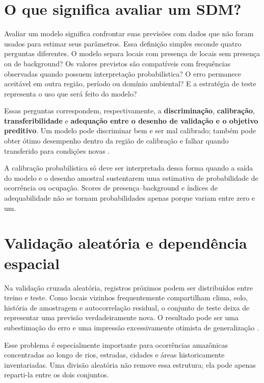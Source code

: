 \section{O que significa avaliar um SDM?}

Avaliar um modelo significa confrontar suas previsões com dados que não foram
usados para estimar seus parâmetros. Essa definição simples esconde quatro
perguntas diferentes. O modelo separa locais com presença de locais sem presença
ou de background? Os valores previstos são compatíveis com frequências
observadas quando possuem interpretação probabilística? O erro permanece
aceitável em outra região, período ou domínio ambiental? E a estratégia de teste
representa o uso que será feito do modelo?

Essas perguntas correspondem, respectivamente, a \textbf{discriminação},
\textbf{calibração}, \textbf{transferibilidade} e \textbf{adequação entre o
desenho de validação e o objetivo preditivo}. Um modelo pode discriminar bem e
ser mal calibrado; também pode obter ótimo desempenho dentro da região de
calibração e falhar quando transferido para condições novas
\parencite{vaughan2005testing,jimenezvalverde2013discrimination,roberts2017crossvalidation}.

\begin{atencao}[title={\faExclamationTriangle\quad Adequabilidade não é automaticamente probabilidade}]
	A calibração probabilística só deve ser interpretada dessa forma quando a
	saída do modelo e o desenho amostral sustentarem uma estimativa de
	probabilidade de ocorrência ou ocupação. Scores de presença--background e
	índices de adequabilidade não se tornam probabilidades apenas porque variam
	entre zero e um.
\end{atencao}

\section{Validação aleatória e dependência espacial}

Na validação cruzada aleatória, registros próximos podem ser distribuídos entre
treino e teste. Como locais vizinhos frequentemente compartilham clima, solo,
história de amostragem e autocorrelação residual, o conjunto de teste deixa de
representar uma previsão verdadeiramente nova. O resultado pode ser uma
subestimação do erro e uma impressão excessivamente otimista de generalização
\parencite{roberts2017crossvalidation}.

Esse problema é especialmente importante para ocorrências amazônicas
concentradas ao longo de rios, estradas, cidades e áreas historicamente
inventariadas. Uma divisão aleatória não remove essa estrutura; ela pode apenas
reparti-la entre os dois conjuntos.

